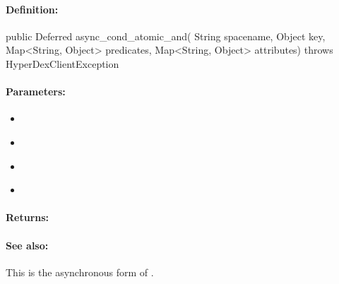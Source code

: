 \paragraph{Definition:}
\begin{javacode}
public Deferred async_cond_atomic_and(
        String spacename,
        Object key,
        Map<String, Object> predicates,
        Map<String, Object> attributes) throws HyperDexClientException
\end{javacode}

\paragraph{Parameters:}
\begin{itemize}[noitemsep]
\item {}\\

\item {}\\

\item {}\\

\item {}\\

\end{itemize}

\paragraph{Returns:}


\paragraph{See also:}  This is the asynchronous form of .

\pagebreak
\subsubsection{}
\label{api:java:group_atomic_or}


